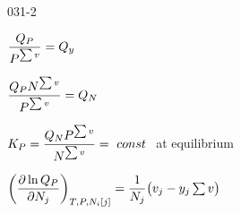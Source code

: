\begin{mitframe}{031-2}


	\begin{listone}
    
 	 \item $\dfrac{\heatflow_{\p}}{\p^{\sum\vvel}}=\heatflow_{y}$
   
    \item $\dfrac{\heatflow_{\p}\nummoles^{\sum\nolimits\vvel}}{\p^{\sum\nolimits\vvel}}=\heatflow_{\nummoles}$
    
    \item $\peqconst=\dfrac{\heatflow_{\nummoles}\p^{\sum\vvel}}{\nummoles^{\sum\nolimits\vvel}}=~const~$ at equilibrium
    
    \item $\bigg(\dfrac{\partial\ln\heatflow_{\p}}{\partial\nummoles_{j}}\bigg)_{\Temp,\p,\nummoles_{\state}[j]}=\dfrac{1}{\nummoles_{j}}\big(\vvel_{j}-y_{j}\sum\vvel\big)$

	\end{listone}

\end{mitframe}